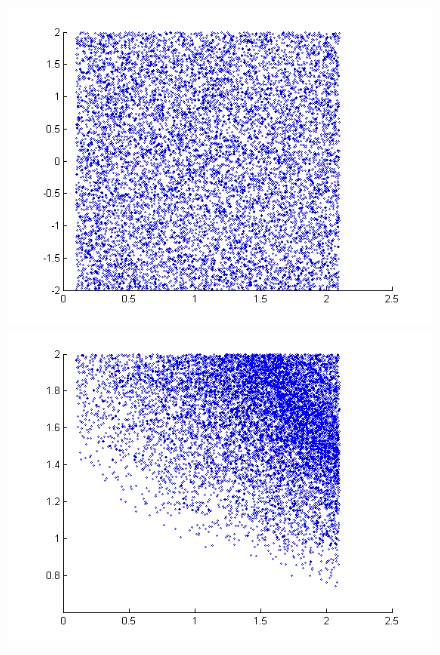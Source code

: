 \documentclass{article}
\newcommand{\nn}{0.16}
\begin{document}
\begin{figure}
\begin{center}
\begin{minipage}[b]{\nn\textwidth}
                \includegraphics[width=1\textwidth]{Figs/col_m1_v1.png}
        \end{minipage}%
%
\begin{minipage}[b]{\nn\textwidth}
                \includegraphics[width=1\textwidth]{Figs/col_m1v1_p3.png}

\end{minipage}
\end{center}
\end{figure}
\end{document}
